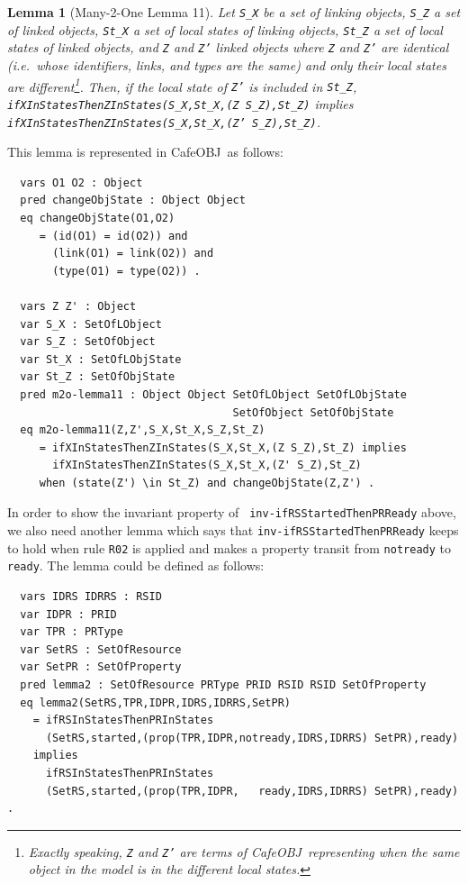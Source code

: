 \documentclass[12pt]{report}
\newtheorem{lemma}{Lemma}
\newcommand{\stt}[1]{{\small{\tt {#1}}}}
\newcommand{\cafeobj}{{\sf CafeOBJ}~}
\begin{document}
\begin{lemma}[Many-2-One Lemma 11]
  Let {\tt S\_X} be a set of linking objects, {\tt S\_Z} a set of
  linked objects, {\tt St\_X} a set of local states of linking
  objects, {\tt St\_Z} a set of local states of linked objects, and
  {\tt Z} and {\tt Z'} linked objects where {\tt Z} and {\tt Z'}
  are identical (i.e.\ whose identifiers, links, and types are the
  same) and only their local states are different\footnote{Exactly
    speaking, {\tt Z} and {\tt Z'} are terms of \cafeobj representing
    when the same object in the model is in the different local
    states.}.  Then, if the local state of {\tt Z'} is included in
  {\tt St\_Z}, \stt{ifXInStatesThenZInStates(S\_X,St\_X,(Z S\_Z),St\_Z)}
  implies\\ \stt{ifXInStatesThenZInStates(S\_X,St\_X,(Z' S\_Z),St\_Z)}.
\end{lemma}
This lemma is represented in \cafeobj as follows:
\small
\begin{verbatim}
  vars O1 O2 : Object
  pred changeObjState : Object Object
  eq changeObjState(O1,O2)
     = (id(O1) = id(O2)) and 
       (link(O1) = link(O2)) and
       (type(O1) = type(O2)) .

  vars Z Z' : Object
  var S_X : SetOfLObject
  var S_Z : SetOfObject
  var St_X : SetOfLObjState
  var St_Z : SetOfObjState
  pred m2o-lemma11 : Object Object SetOfLObject SetOfLObjState
                                   SetOfObject SetOfObjState
  eq m2o-lemma11(Z,Z',S_X,St_X,S_Z,St_Z)
     = ifXInStatesThenZInStates(S_X,St_X,(Z S_Z),St_Z) implies
       ifXInStatesThenZInStates(S_X,St_X,(Z' S_Z),St_Z) 
     when (state(Z') \in St_Z) and changeObjState(Z,Z') .
\end{verbatim}
\normalsize
In order to show the invariant property of {\tt
  inv-ifRSStartedThenPRReady} above, we also need another lemma which
says that {\tt inv-ifRSStartedThenPRReady} keeps to hold when rule
{\tt R02} is applied and makes a property transit from {\tt notready}
to {\tt ready}.  The lemma could be defined as follows:
\small
\begin{verbatim}
  vars IDRS IDRRS : RSID 
  var IDPR : PRID
  var TPR : PRType
  var SetRS : SetOfResource
  var SetPR : SetOfProperty
  pred lemma2 : SetOfResource PRType PRID RSID RSID SetOfProperty
  eq lemma2(SetRS,TPR,IDPR,IDRS,IDRRS,SetPR)
    = ifRSInStatesThenPRInStates
      (SetRS,started,(prop(TPR,IDPR,notready,IDRS,IDRRS) SetPR),ready)
    implies
      ifRSInStatesThenPRInStates
      (SetRS,started,(prop(TPR,IDPR,   ready,IDRS,IDRRS) SetPR),ready) .
\end{verbatim}
\end{document}
